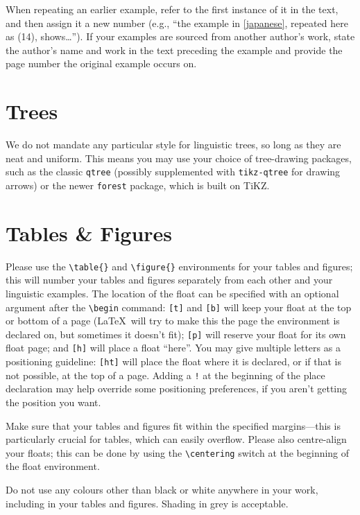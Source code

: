 \documentclass[xelatex,linguex]{TWPL}
\begin{document}
When repeating an earlier example, refer to the first instance of it in the text, and then assign it a new number (e.g., ``the example in \ref{japanese}, repeated here as (14), shows\ldots'').  If your examples are sourced from another author's work, state the author's name and work in the text preceding the example and provide the page number the original example occurs on.

\section{Trees}

We do not mandate any particular style for linguistic trees, so long as they are neat and uniform. This means you may use your choice of tree-drawing packages, such as the classic \texttt{qtree} (possibly supplemented with \texttt{tikz-qtree} for drawing arrows) or the newer \texttt{forest} package, which is built on TiKZ.

\section{Tables \& Figures}

Please use the \verb;\table{}; and \verb;\figure{}; environments for your tables and figures; this will number your tables and figures separately from each other and your linguistic examples. The location of the float can be specified with an optional argument after the \verb;\begin; command: \texttt{[t]} and \texttt{[b]} will keep your float at the top or bottom of a page (\LaTeX\ will try to make this the page the environment is declared on, but sometimes it doesn't fit); \texttt{[p]} will reserve your float for its own float page; and \texttt{[h]} will place a float ``here''. You may give multiple letters as a positioning guideline: \texttt{[ht]} will place the float where it is declared, or if that is not possible, at the top of a page. Adding a \texttt{!} at the beginning of the place declaration may help override some positioning preferences, if you aren't getting the position you want.

Make sure that your tables and figures fit within the specified margins---this is particularly crucial for tables, which can easily overflow. Please also centre-align your floats; this can be done by using the \verb;\centering; switch at the beginning of the float environment. 

Do not use any colours other than black or white anywhere in your work, including in your tables and figures. Shading in grey is acceptable. 
\end{document}

